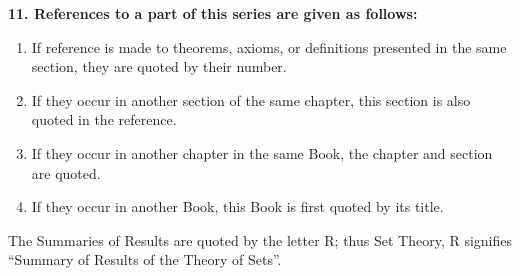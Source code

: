 \par\noindent\textbf{11. References to a part of this series are given as follows:}\par

\begin{enumerate}
\def\labelenumi{\alph{enumi})}
\item
  If reference is made to theorems, axioms, or definitions presented in the same section, they are quoted by their number.
\item
  If they occur in another section of the same chapter, this section is also quoted in the reference.
\item
  If they occur in another chapter in the same Book, the chapter and section are quoted.
\item
  If they occur in another Book, this Book is first quoted by its title.
\end{enumerate}

The Summaries of Results are quoted by the letter R; thus Set Theory, R signifies ``Summary of Results of the Theory of Sets''.

